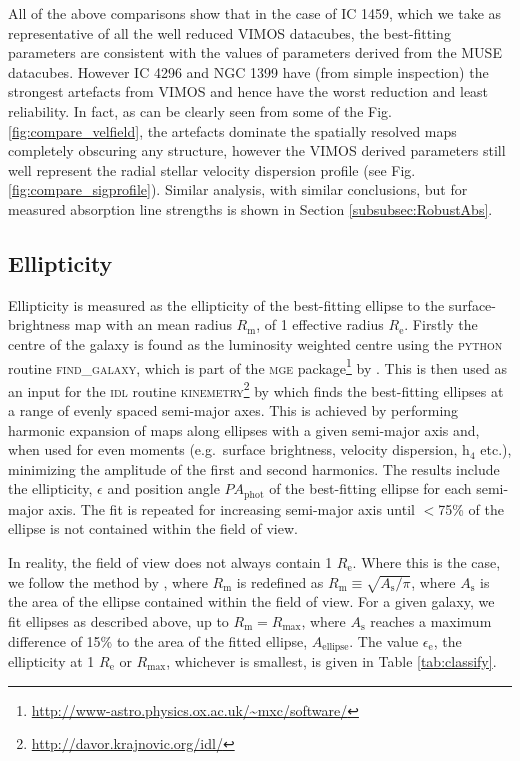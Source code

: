 			All of the above comparisons show that in the case of IC 1459, which we take as representative of all the well reduced VIMOS datacubes, the best-fitting parameters are consistent with the values of parameters derived from the MUSE datacubes. However IC 4296 and NGC 1399 have (from simple inspection) the strongest artefacts from VIMOS and hence have the worst reduction and least reliability. In fact, as can be clearly seen from some of the Fig.\,\ref{fig:compare_velfield}, the artefacts dominate the spatially resolved maps completely obscuring any structure, however the VIMOS derived parameters still well represent the radial stellar velocity dispersion profile (see Fig.\,\ref{fig:compare_sigprofile}). Similar analysis, with similar conclusions, but for measured absorption line strengths is shown in Section \ref{subsubsec:RobustAbs}.


	\subsection{Ellipticity}
		\label{subsec:Ellipticity}

		Ellipticity is measured as the ellipticity of the best-fitting ellipse to the surface-brightness map with an mean radius $R_\mathrm{m}$, of 1 effective radius $R_\mathrm{e}$. Firstly the centre of the galaxy is found as the luminosity weighted centre using the \textsc{python} routine \textsc{find\_galaxy}, which is part of the \textsc{mge} package\footnote{\url{http://www-astro.physics.ox.ac.uk/\~mxc/software/}} by \citet{Cappellari2002}. This is then used as an input for the \textsc{idl} routine \textsc{kinemetry}\footnote{\url{http://davor.krajnovic.org/idl/}} by \citet{Krajnovic2006} which finds the best-fitting ellipses at a range of evenly spaced semi-major axes. This is achieved by performing harmonic expansion of maps along ellipses with a given semi-major axis and, when used for even moments (e.g.\ surface brightness, velocity dispersion, h$_4$ etc.), minimizing the amplitude of the first and second harmonics. The results include the ellipticity, $\epsilon$ and position angle $PA_\text{phot}$ of the best-fitting ellipse for each semi-major axis. The fit is repeated for increasing semi-major axis until $<$75\% of the ellipse is not contained within the field of view.

		In reality, the field of view does not always contain 1 $R_\mathrm{e}$. Where this is the case, we follow the method by \citet{Emsellem2007}, where $R_\mathrm{m}$ is redefined as $R_\mathrm{m} \equiv \sqrt{A_\mathrm{s}/\pi}$, where $A_\mathrm{s}$ is the area of the ellipse contained within the field of view. For a given galaxy, we fit ellipses as described above, up to $R_\mathrm{m} = R_\mathrm{max}$, where $A_\mathrm{s}$ reaches a maximum difference of 15\% to the area of the fitted ellipse, $A_\text{ellipse}$. The value $\epsilon_\mathrm{e}$, the ellipticity at 1 $R_\mathrm{e}$ or $R_\text{max}$, whichever is smallest, is given in Table \ref{tab:classify}. 

